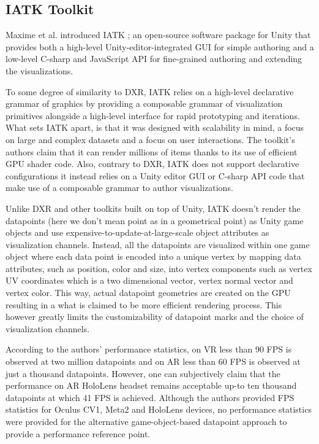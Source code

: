 \documentclass{vgtc}                          %
\begin{document}
\subsection{IATK Toolkit}
Maxime et al. introduced IATK \cite{iatk_toolkit}; an open-source software
package for Unity that provides both a high-level Unity-editor-integrated GUI
for simple authoring and a low-level C-sharp and JavaScript API for
fine-grained authoring and extending the visualizations.

To some degree of similarity to DXR, IATK relies on a high-level declarative
grammar of graphics by providing a composable grammar of visualization
primitives alongside a high-level interface for rapid prototyping and
iterations. What sets IATK apart, is that it was designed with scalability in
mind, a focus on large and complex datasets and a focus on user interactions.
The toolkit's authors claim that it can render millions of items thanks to its
use of efficient GPU shader code. Also, contrary to DXR, IATK does not support
declarative configurations it instead relies on a Unity editor GUI or C-sharp
API code that make use of a composable grammar to author visualizations.

Unlike DXR and other toolkits built on top of Unity, IATK doesn't render
the datapoints (here we don't mean point as in a geometrical point) as Unity
game objects and use expensive-to-update-at-large-scale object attributes as
visualization channels. Instead, all the datapoints are visualized within one
game object where each data point is encoded into a unique vertex by mapping
data attributes, such as position, color and size, into vertex components such
as vertex UV coordinates which is a two dimensional vector, vertex normal vector
and vertex color. This way, actual datapoint geometries are created on the GPU
resulting in a what is claimed to be more efficient rendering process. This
however greatly limits the customizability of datapoint marks and the choice
of visualization channels.

According to the authors' performance statistics, on VR less than 90 FPS is
observed at two million datapoints and on AR less than 60 FPS is observed at
just a thousand datapoints. However, one can subjectively claim that the performance on AR
HoloLens headset remains acceptable up-to ten thousand datapoints at which 41
FPS is achieved. Although the authors provided FPS statistics for Oculus CV1,
Meta2 and HoloLens devices, no performance statistics were provided for the
alternative game-object-based datapoint approach to provide a performance
reference point.
\end{document}
